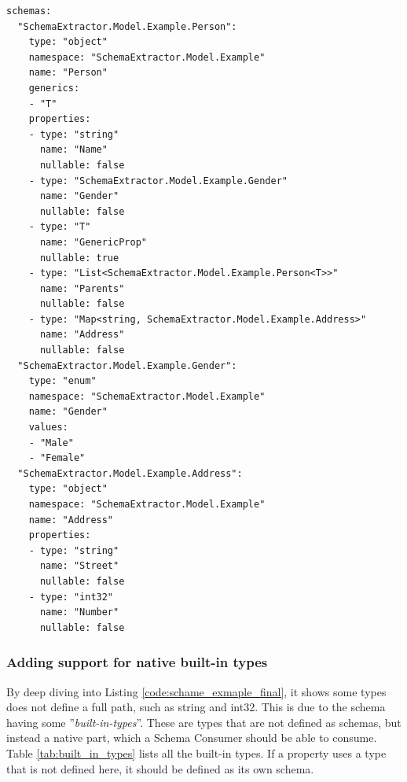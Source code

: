 \begin{lstlisting}[caption={Schema definition}, label={code:schame_exmaple_final}, style=yaml]
schemas:
  "SchemaExtractor.Model.Example.Person":
    type: "object"
    namespace: "SchemaExtractor.Model.Example"
    name: "Person"
    generics:
    - "T"
    properties:
    - type: "string"
      name: "Name"
      nullable: false
    - type: "SchemaExtractor.Model.Example.Gender"
      name: "Gender"
      nullable: false
    - type: "T"
      name: "GenericProp"
      nullable: true
    - type: "List<SchemaExtractor.Model.Example.Person<T>>"
      name: "Parents"
      nullable: false
    - type: "Map<string, SchemaExtractor.Model.Example.Address>"
      name: "Address"
      nullable: false
  "SchemaExtractor.Model.Example.Gender":
    type: "enum"
    namespace: "SchemaExtractor.Model.Example"
    name: "Gender"
    values:
    - "Male"
    - "Female"
  "SchemaExtractor.Model.Example.Address":
    type: "object"
    namespace: "SchemaExtractor.Model.Example"
    name: "Address"
    properties:
    - type: "string"
      name: "Street"
      nullable: false
    - type: "int32"
      name: "Number"
      nullable: false
\end{lstlisting}

\subsubsection{Adding support for native built-in types}
By deep diving into Listing \ref{code:schame_exmaple_final}, it shows some types does not define a full path, such as string and int32.
This is due to the schema having some ''\textit{built-in-types}''. These are types that are not defined as schemas, but instead a native part, which a Schema Consumer should be able to consume. Table \ref{tab:built_in_types} lists all the built-in types. If a property uses a type that is not defined here, it should be defined as its own schema.

